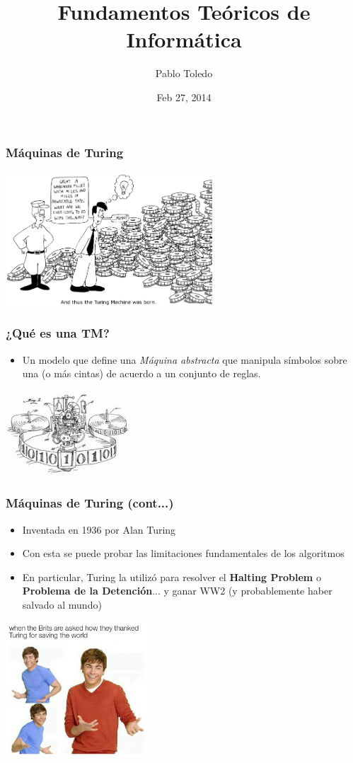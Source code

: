 \documentclass{beamer}                  %
\title[Final - FTI]{Fundamentos Teóricos de Informática}
\author[PATM]{Pablo Toledo}
\institute[UNPSJB]{UNPSJB}
\date{Feb 27, 2014}
\begin{document}
    \frame{\titlepage}
    \begin{frame}
        \frametitle{Máquinas de Turing}

        \center\includegraphics[height=189px]{turing}
        \endcenter
    \end{frame}
    \begin{frame}
        \frametitle{¿Qué es una TM?}
        \begin{itemize}
            \item Un modelo que define una \textit{Máquina abstracta} que manipula símbolos sobre una (o más cintas) de acuerdo a un conjunto de reglas.
        \end{itemize}
        \center\includegraphics[height=120px]{turingmachine}
    \end{frame}
    \begin{frame}
        \frametitle{Máquinas de Turing (cont...)}
        \begin{itemize}
            \item Inventada en 1936 por Alan Turing
            \item Con esta se puede probar las limitaciones fundamentales de los algoritmos
            \item En particular, Turing la utilizó para resolver el \textbf{Halting Problem} o \textbf{Problema de la Detención}... y ganar WW2 (y probablemente haber salvado al mundo)
        \end{itemize}
    \end{frame}

    \begin{frame}
    \center\includegraphics[width=200px]{zac}
    \endcenter 
    \end{frame}
\end{document}
